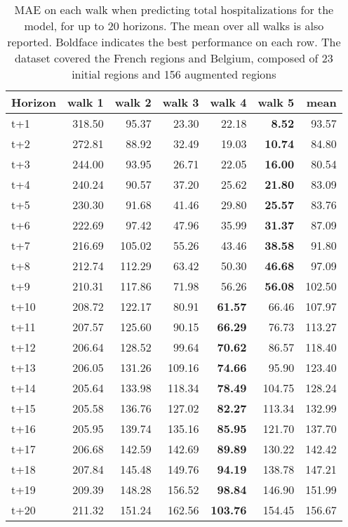 \begin{table}[H]
\centering
\caption{MAE on each walk when predicting total hospitalizations for the model, for up to 20 horizons. The mean over all walks is also reported. Boldface indicates the best performance on each row. The dataset covered the French regions and Belgium, composed of 23 initial regions and 156 augmented regions }
\label{tab:MAE_walk_encoder_decoder}
\begin{tabular}{lrrrrrr}
\toprule
Horizon &  walk 1 &  walk 2 &  walk 3 &  walk 4 &  walk 5 &   mean \\
\midrule
t+1  & 318.50  & 95.37  & 23.30  & 22.18  & \textbf{8.52}  & 93.57  \\
t+2  & 272.81  & 88.92  & 32.49  & 19.03  & \textbf{10.74}  & 84.80  \\
t+3  & 244.00  & 93.95  & 26.71  & 22.05  & \textbf{16.00}  & 80.54  \\
t+4  & 240.24  & 90.57  & 37.20  & 25.62  & \textbf{21.80}  & 83.09  \\
t+5  & 230.30  & 91.68  & 41.46  & 29.80  & \textbf{25.57}  & 83.76  \\
t+6  & 222.69  & 97.42  & 47.96  & 35.99  & \textbf{31.37}  & 87.09  \\
t+7  & 216.69  & 105.02  & 55.26  & 43.46  & \textbf{38.58}  & 91.80  \\
t+8  & 212.74  & 112.29  & 63.42  & 50.30  & \textbf{46.68}  & 97.09  \\
t+9  & 210.31  & 117.86  & 71.98  & 56.26  & \textbf{56.08}  & 102.50  \\
t+10  & 208.72  & 122.17  & 80.91  & \textbf{61.57}  & 66.46  & 107.97  \\
t+11  & 207.57  & 125.60  & 90.15  & \textbf{66.29}  & 76.73  & 113.27  \\
t+12  & 206.64  & 128.52  & 99.64  & \textbf{70.62}  & 86.57  & 118.40  \\
t+13  & 206.05  & 131.26  & 109.16  & \textbf{74.66}  & 95.90  & 123.40  \\
t+14  & 205.64  & 133.98  & 118.34  & \textbf{78.49}  & 104.75  & 128.24  \\
t+15  & 205.58  & 136.76  & 127.02  & \textbf{82.27}  & 113.34  & 132.99  \\
t+16  & 205.95  & 139.74  & 135.16  & \textbf{85.95}  & 121.70  & 137.70  \\
t+17  & 206.68  & 142.59  & 142.69  & \textbf{89.89}  & 130.22  & 142.42  \\
t+18  & 207.84  & 145.48  & 149.76  & \textbf{94.19}  & 138.78  & 147.21  \\
t+19  & 209.39  & 148.28  & 156.52  & \textbf{98.84}  & 146.90  & 151.99  \\
t+20  & 211.32  & 151.24  & 162.56  & \textbf{103.76}  & 154.45  & 156.67  \\

\bottomrule
\end{tabular}
\end{table}
